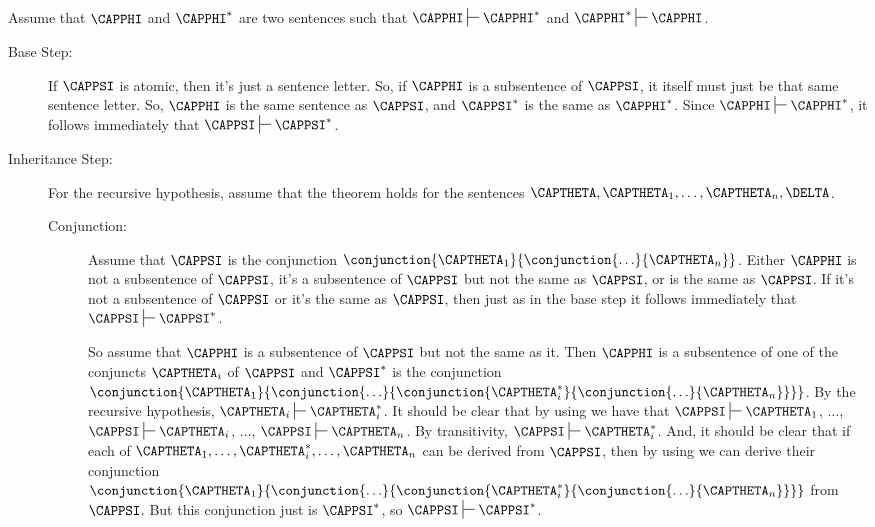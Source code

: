 \begin{PROOF}
Assume that $\CAPPHI$ and $\CAPPHI^*$ are two \GSL{} sentences such that $\CAPPHI\sststile{}{}\CAPPHI^*$ and $\CAPPHI^*\sststile{}{}\CAPPHI$.
\begin{description}
\item[Base Step:] If $\CAPPSI$ is atomic, then it's just a sentence letter. 
So, if $\CAPPHI$ is a subsentence of $\CAPPSI$, it itself must just be that same sentence letter. 
So, $\CAPPHI$ is the same sentence as $\CAPPSI$, and $\CAPPSI^*$ is the same as $\CAPPHI^*$. 
Since $\CAPPHI\sststile{}{}\CAPPHI^*$, it follows immediately that $\CAPPSI\sststile{}{}\CAPPSI^*$.
\item[Inheritance Step:] For the recursive hypothesis, assume that the theorem holds for the sentences $\CAPTHETA,\CAPTHETA_1,\ldots,\CAPTHETA_n,\DELTA$.
\begin{description}
\item[Conjunction:] Assume that $\CAPPSI$ is the conjunction $\conjunction{\CAPTHETA_1}{\conjunction{\ldots}{\CAPTHETA_{\integer{n}}}}$. 
Either $\CAPPHI$ is not a subsentence of $\CAPPSI$, it's a subsentence of $\CAPPSI$ but not the same as $\CAPPSI$, or is the same as $\CAPPSI$. 
If it's not a subsentence of $\CAPPSI$ or it's the same as $\CAPPSI$, then just as in the base step it follows immediately that $\CAPPSI\sststile{}{}\CAPPSI^*$.

So assume that $\CAPPHI$ is a subsentence of $\CAPPSI$ but not the same as it. 
Then $\CAPPHI$ is a subsentence of one of the conjuncts $\CAPTHETA_{\integer{i}}$ of $\CAPPSI$ and $\CAPPSI^*$ is the conjunction $\conjunction{\CAPTHETA_1}{\conjunction{\ldots}{\conjunction{\CAPTHETA_{\integer{i}}^*}{\conjunction{\ldots}{\CAPTHETA_{\integer{n}}}}}}$. 
By the recursive hypothesis, $\CAPTHETA_{\integer{i}}\sststile{}{}\CAPTHETA_{\integer{i}}^*$. 
It should be clear that by using  we have that $\CAPPSI\sststile{}{}\CAPTHETA_1$, $\ldots$, $\CAPPSI\sststile{}{}\CAPTHETA_{\integer{i}}$, $\ldots$, $\CAPPSI\sststile{}{}\CAPTHETA_{\integer{n}}$. 
By transitivity, $\CAPPSI\sststile{}{}\CAPTHETA_{\integer{i}}^*$.
And, it should be clear that if each of $\CAPTHETA_1,\ldots,\CAPTHETA_{\integer{i}}^*,\ldots,\CAPTHETA_{\integer{n}}$ can be derived from $\CAPPSI$, then by using  we can derive their conjunction $\conjunction{\CAPTHETA_1}{\conjunction{\ldots}{\conjunction{\CAPTHETA_{\integer{i}}^*}{\conjunction{\ldots}{\CAPTHETA_{\integer{n}}}}}}$ from $\CAPPSI$. 
But this conjunction just is $\CAPPSI^*$, so $\CAPPSI\sststile{}{}\CAPPSI^*$.


\end{description}
\end{description}
\end{PROOF}
